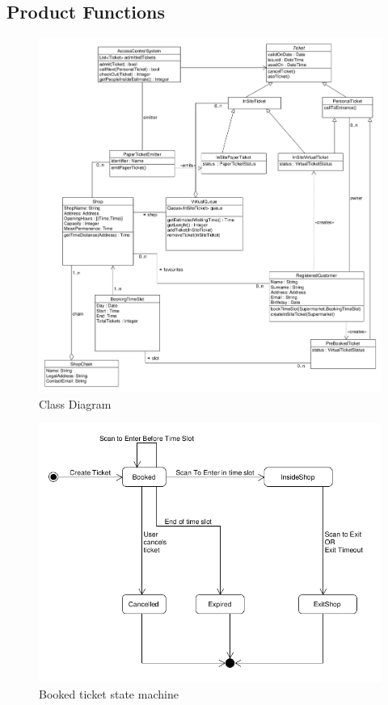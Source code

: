 \subsection{Product Functions}    
    \begin{figure}
        \centering
        \includegraphics[width=\textwidth]{Images/UML_class_synthetic.png}
        \caption{\label{fig:Booked_Ticket_State}Class Diagram}
    \end{figure}
    \begin{figure}
    \centering
    \includegraphics[width=\textwidth]{Images/UML_booked_ticket.png}
    \caption{\label{fig:Booked_Ticket_State}Booked ticket state machine}
    \end{figure}
